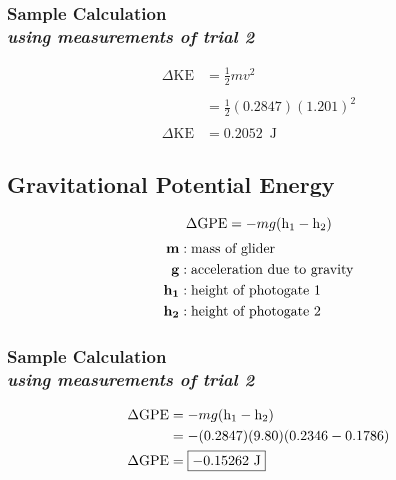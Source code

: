 \subsubsection{Sample Calculation \\ {\normalfont \small\textit{using measurements of trial 2}}}


\begin{align*}
	\Delta{\text{KE}} &= \frac{1}{2}mv^2 \\ \\
										&= \frac{1}{2}(0.2847)(1.201)^2 \\ \\
	\Delta{\text{KE}} &= \boxed{0.2052\,\text{ J}}
\end{align*}


\subsection{Gravitational Potential Energy} 

\vspace{0.5cm}

{\centering
\begin{equation}
	\Delta{\text{GPE}} = -mg(\text{h\textsubscript{1}} - \text{h\textsubscript{2}}) 
	\label{eq:energyP}
\end{equation}
\begin{align*}
	\mathbf{m} &: \text{mass of glider}	\\
	\mathbf{g} &: \text{acceleration due to gravity} \\
	\textbf{h\textsubscript{1}} &: \text{height of photogate 1} \\
	\textbf{h\textsubscript{2}} &: \text{height of photogate 2} 
\end{align*}}

\subsubsection{Sample Calculation \\ {\normalfont \small\textit{using measurements of trial 2}}}

\begin{align*}
	\Delta{\text{GPE}} &= -mg(\text{h\textsubscript{1}} - \text{h\textsubscript{2}}) \\
										 &= -(0.2847)(9.80)(0.2346-0.1786) \\
	\Delta{\text{GPE}} &= \boxed{-0.15262\text{ J}}
\end{align*}

